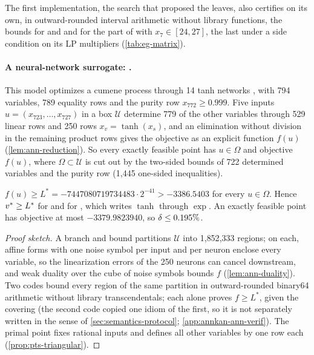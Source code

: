 The first implementation, the search that proposed the leaves, also certifies on its own, in outward-rounded interval arithmetic without library functions, the bounds for  and  and for the part of  with $x_7\in[24,27]$, the last under a side condition on its LP multipliers (\cref{tab:eg-matrix}).

\paragraph{A neural-network surrogate: .}
This model optimizes a cumene process through 14 tanh networks \citep{schweidtmann2019-deterministic-global-optimization-with-artificial}, with 794 variables, 789 equality rows and the purity row $x_{772}\ge0.999$.
Five inputs $u=(x_{723},\dots,x_{727})$ in a box $\mathcal U$ determine 779 of the other variables through 529 linear rows and 250 rows $x_v=\tanh(x_s)$, and an elimination without division in the remaining product rows gives the objective as an explicit function $f(u)$ (\cref{lem:ann-reduction}).
So every exactly feasible point has $u\in\Omega$ and objective $f(u)$, where $\Omega\subset\mathcal U$ is cut out by the two-sided bounds of 722 determined variables and the purity row (1{,}445 one-sided inequalities).

\begin{theorem}\label{thm:ann-bound}
$f(u)\ge L^*=-7447080719734483\cdot2^{-41}>-3386.5403$ for every $u\in\Omega$.
Hence $v^{*}\ge L^*$ for  and for , which writes $\tanh$ through $\exp$.
An exactly feasible point has objective at most $-3379.9823940$, so $\delta\le0.195\%$.
\end{theorem}

\begin{proof}[Proof sketch]
A branch and bound partitions $\mathcal U$ into 1{,}852{,}333 regions; on each, affine forms with one noise symbol per input and per neuron enclose every variable, so the linearization errors of the 250 neurons can cancel downstream, and weak duality over the cube of noise symbols bounds $f$ (\cref{lem:ann-duality}).
Two codes bound every region of the same partition in outward-rounded binary64 arithmetic without library transcendentals; each alone proves $f\ge L^*$, given the covering (the second code copied one idiom of the first, so it is not separately written in the sense of \cref{sec:semantics-protocol}; \cref{app:annkan-ann-verif}).
The primal point fixes rational inputs and defines all other variables by one row each (\cref{prop:pts-triangular}).
\end{proof}

